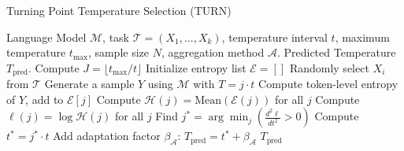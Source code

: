 \begin{algorithm}
\caption{Turning Point Temperature Selection \textsc(TURN)}
\label{alg:auto find}
\begin{algorithmic}[1]
 Language Model $\mathcal{M}$, task $\mathcal{T}=\left(X_1, ..., X_k\right)$, temperature interval $t$, maximum temperature $t_{\max}$, sample size $N$, aggregation method $\mathcal{A}$.
 Predicted Temperature $T_{\text{pred}}$.
\STATE Compute $J = \lfloor t_{\max}/t \rfloor$ 
\STATE Initialize entropy list $\mathcal{E} = []$
    \STATE Randomly select $X_i$ from $\mathcal{T}$
        \STATE Generate a sample $Y$ using $\mathcal{M}$ with $T = j\cdot t$
        \STATE Compute token-level entropy of $Y$, add to $\mathcal{E}[j]$
    \ENDFOR
\ENDFOR
\STATE Compute $\mathcal{H}(j)=\text{Mean}\left(\mathcal{E}(j)\right)$ for all $j$
\STATE Compute $\ell(j) = \log \mathcal{H}(j)$ for all $j$
\STATE Find $j^* = \arg\min_j \left( \frac{d^2\ell}{dt^2}>0 \right)$
\STATE Compute $t^* = j^* \cdot t$
\STATE Add adaptation factor $\beta_{\mathcal{A}}$: $T_{\text{pred}} = t^* + \beta_{\mathcal{A}}$
 $T_{\text{pred}}$
\end{algorithmic}
\end{algorithm}
\vspace{-5mm}
